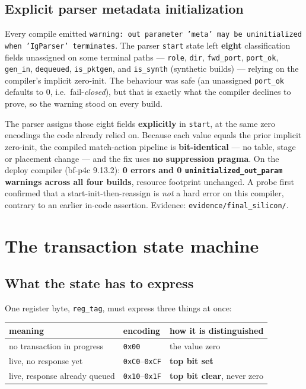 \documentclass[10pt,a4paper,oneside]{article}
\newcommand{\code}[1]{\texttt{\small #1}}
\begin{document}
\subsection{Explicit parser metadata initialization}

Every compile emitted \code{warning: out parameter 'meta' may be uninitialized when 'IgParser'
terminates}. The parser \code{start} state left \textbf{eight} classification fields unassigned
on some terminal paths --- \code{role}, \code{dir}, \code{fwd\_port}, \code{port\_ok},
\code{gen\_in}, \code{dequeued}, \code{is\_pktgen}, and \code{is\_synth} (synthetic builds) ---
relying on the compiler's implicit zero-init. The behaviour was safe (an unassigned
\code{port\_ok} defaults to 0, i.e.\ fail-\emph{closed}), but that is exactly what the compiler
declines to prove, so the warning stood on every build.

The parser assigns those eight fields \textbf{explicitly} in \code{start}, at the same zero
encodings the code already relied on. Because each value equals the prior implicit zero-init,
the compiled match-action pipeline is \textbf{bit-identical} --- no table, stage or placement
change --- and the fix uses \textbf{no suppression pragma}. On the deploy compiler (bf-p4c
9.13.2): \textbf{0 errors and 0 \code{uninitialized\_out\_param} warnings across all four
builds}, resource footprint unchanged. A probe first confirmed that a start-init-then-reassign
is \emph{not} a hard error on this compiler, contrary to an earlier in-code assertion.
Evidence: \code{evidence/final\_silicon/}.

\section{The transaction state machine}
\label{sec:fsm}

\subsection{What the state has to express}

One register byte, \code{reg\_tag}, must express three things at once:

\begin{center}
\begin{tabular}{ll>{\raggedright\arraybackslash}p{}}
\toprule
\textbf{meaning} & \textbf{encoding} & \textbf{how it is distinguished} \\
\midrule
no transaction in progress & \code{0x00} & the value zero \\
live, no response yet & \code{0xC0}--\code{0xCF} & \textbf{top bit set} \\
live, response already queued & \code{0x10}--\code{0x1F} & \textbf{top bit clear}, never zero \\
\bottomrule
\end{tabular}
\end{center}
\end{document}
